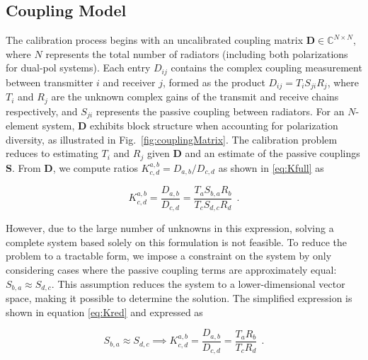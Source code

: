 \documentclass[journal]{IEEEtran}
\begin{document}



\subsection{Coupling Model}

The calibration process begins with an uncalibrated coupling matrix $\mathbf{D} \in \mathbb{C}^{N \times N}$, where $N$ represents the total number of radiators (including both polarizations for dual-pol systems). Each entry $D_{ij}$ contains the complex coupling measurement between transmitter $i$ and receiver $j$, formed as the product
$D_{ij} = T_i S_{ji} R_j$,
where $T_i$ and $R_j$ are the unknown complex gains of the transmit and receive chains respectively, and $S_{ji}$ represents the passive coupling between radiators. For an $N$-element system, $\mathbf{D}$ exhibits block structure when accounting for polarization diversity, as illustrated in Fig.~\ref{fig:couplingMatrix}. The calibration problem reduces to estimating $T_i$ and $R_j$ given $\mathbf{D}$ and an estimate of the passive couplings $\mathbf{S}$. From $\mathbf{D}$, we compute ratios $K^{a,b}_{c,d} = D_{a,b}/D_{c,d}$ as shown in \eqref{eq:Kfull} as

\begin{equation} \label{eq:Kfull}
    K^{a,b}_{c,d} = \frac{D_{a,b}}{D_{c,d}} = \frac{T_aS_{b,a}R_b}{T_cS_{d,c}R_d} ~~. 
\end{equation}

However, due to the large number of unknowns in this expression, solving a complete system based solely on this formulation is not feasible. To reduce the problem to a tractable form, we impose a constraint on the system by only considering cases where the passive coupling terms are approximately equal: \( S_{b,a} \approx S_{d,c} \). This assumption reduces the system to a lower-dimensional vector space, making it possible to determine the solution. The simplified expression is shown in equation \eqref{eq:Kred} \cite{fulton,mitchell} and expressed as

\begin{equation} \label{eq:Kred}
    S_{b,a} \approx S_{d,c} \implies K^{a,b}_{c,d} = \frac{D_{a,b}}{D_{c,d}} = \frac{T_aR_b}{T_cR_d} ~~.
\end{equation}
\end{document}
